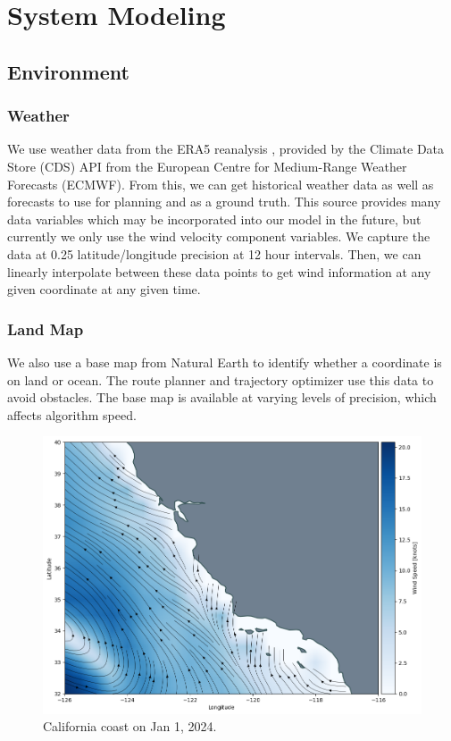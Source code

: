 \documentclass[conference]{IEEEtran}
\begin{document}
\section{System Modeling}

\subsection{Environment}
\label{section:environment}

\subsubsection{Weather}
We use weather data from the ERA5 reanalysis \cite{ERA5}, provided by the Climate Data Store (CDS) API from the European Centre for Medium-Range Weather Forecasts (ECMWF). From this, we can get historical weather data as well as forecasts to use for planning and as a ground truth. This source provides many data variables which may be incorporated into our model in the future, but currently we only use the wind velocity component variables. We capture the data at 0.25\degree{} latitude/longitude precision at 12 hour intervals. Then, we can linearly interpolate between these data points to get wind information at any given coordinate at any given time.

\subsubsection{Land Map}
We also use a base map from Natural Earth \cite{NaturalEarth} to identify whether a coordinate is on land or ocean. The route planner and trajectory optimizer use this data to avoid obstacles. The base map is available at varying levels of precision, which affects algorithm speed.

\begin{figure}[ht]
    \centering
    \includegraphics[width=.9\columnwidth]{fig/environment.png}
    \caption{California coast on Jan 1, 2024.}
    \label{fig:environment}
\end{figure}
\end{document}
